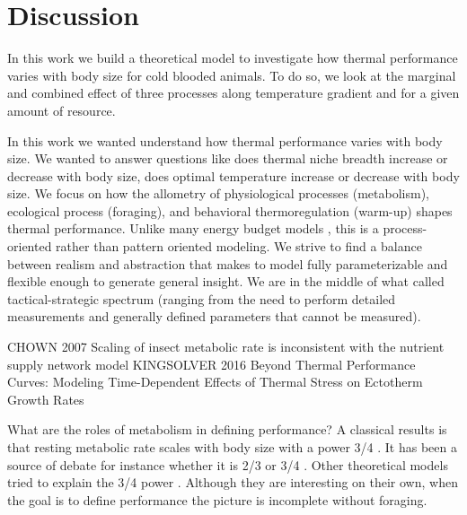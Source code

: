 \section*{Discussion}
In this work we build a theoretical model to investigate how thermal performance varies with body size for cold blooded animals. 
To do so, we look at the marginal and combined effect of three processes along temperature gradient and for a given amount of resource. 


In this work we wanted understand how thermal performance varies with body size.
We wanted to answer questions like does thermal niche breadth increase or decrease with body size, does optimal temperature increase or decrease with body size.
We focus on how the allometry of physiological processes (metabolism), ecological process (foraging), and behavioral thermoregulation (warm-up) shapes thermal performance. 
Unlike many energy budget models \citep[e.g.,][]{Brown1993,Kooijmann2009}, this is a process-oriented rather than pattern oriented modeling.
We strive to find a balance between realism and abstraction that makes to model fully parameterizable and flexible enough to generate general insight.
We are in the middle of what \citet{Hooling1966} called tactical-strategic spectrum (ranging from the need to perform detailed measurements and generally defined parameters that cannot be measured).

CHOWN 2007 Scaling of insect metabolic rate is inconsistent with the nutrient supply network model
KINGSOLVER 2016	Beyond Thermal Performance Curves: Modeling Time-Dependent Effects of Thermal Stress on Ectotherm Growth Rates

What are the roles of metabolism in defining performance?
A classical results is that resting metabolic rate scales with body size with a power 3/4  \citep{Kleiber1947, Peters1986, Brown2004}.
It has been a source of debate for instance whether it is 2/3 or 3/4 \citep[for refs][]{Yodzis1992, Isaac2010}.
Other theoretical models tried to explain the 3/4 power \citep[e.g.,][]{West1997, Kozlowski1997}.
Although they are interesting on their own, when the goal is to define performance the picture is incomplete without foraging.

